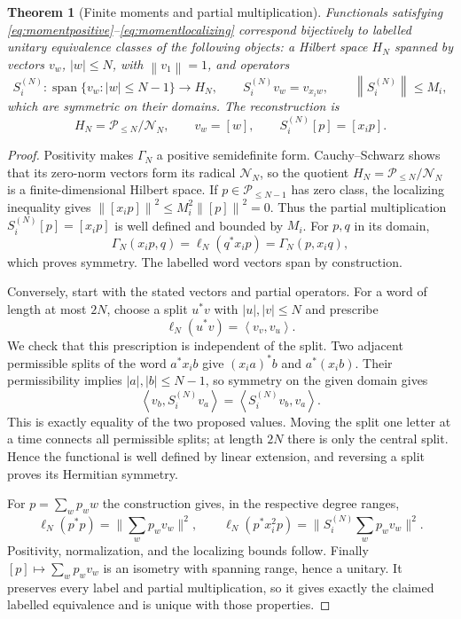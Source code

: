 \documentclass[11pt,a4paper]{amsart}
\numberwithin{equation}{section}
\newtheorem{theorem}{Theorem}[section]
\theoremstyle{definition}
\theoremstyle{remark}
\newcommand{\PP}{\mathcal P}
\DeclareMathOperator{\Span}{span}
\newcommand{\norm}[1]{\left\lVert#1\right\rVert}
\newcommand{\ip}[2]{\left\langle#1,#2\right\rangle}
\begin{document}
\begin{theorem}[Finite moments and partial multiplication]\label{thm:finitejet}
Functionals satisfying \eqref{eq:momentpositive}--\eqref{eq:momentlocalizing} correspond bijectively to labelled unitary equivalence classes of the following objects: a Hilbert space $H_N$ spanned by vectors $v_w$, $|w|\le N$, with $\norm{v_1}=1$, and operators
\[
 S_i^{(N)}:\Span\{v_w:|w|\le N-1\}\longrightarrow H_N,
 \qquad S_i^{(N)}v_w=v_{x_iw},\qquad \norm{S_i^{(N)}}\le M_i,
\]
which are symmetric on their domains. The reconstruction is
\begin{equation}\label{eq:jetinverse}
 H_N=\PP_{\le N}/\mathcal N_N,\qquad v_w=[w],\qquad
 S_i^{(N)}[p]=[x_ip].
\end{equation}
\end{theorem}
\begin{proof}
Positivity makes $\Gamma_N$ a positive semidefinite form. Cauchy--Schwarz shows that its zero-norm vectors form its radical $\mathcal N_N$, so the quotient $H_N=\PP_{\le N}/\mathcal N_N$ is a finite-dimensional Hilbert space. If $p\in\PP_{\le N-1}$ has zero class, the localizing inequality gives
$\norm{[x_ip]}^2\le M_i^2\norm{[p]}^2=0$.
Thus the partial multiplication $S_i^{(N)}[p]=[x_ip]$ is well defined and bounded by $M_i$. For $p,q$ in its domain,
\[
 \Gamma_N(x_ip,q)=\ell_N(q^*x_ip)=\Gamma_N(p,x_iq),
\]
which proves symmetry. The labelled word vectors span by construction.

Conversely, start with the stated vectors and partial operators. For a word of length at most $2N$, choose a split $u^*v$ with $|u|,|v|\le N$ and prescribe
\[
 \ell_N(u^*v)=\ip{v_v}{v_u}.
\]
We check that this prescription is independent of the split. Two adjacent permissible splits of the word $a^*x_ib$ give $(x_ia)^*b$ and $a^*(x_ib)$. Their permissibility implies $|a|,|b|\le N-1$, so symmetry on the given domain gives
\[
 \ip{v_b}{S_i^{(N)}v_a}=\ip{S_i^{(N)}v_b}{v_a}.
\]
This is exactly equality of the two proposed values. Moving the split one letter at a time connects all permissible splits; at length $2N$ there is only the central split. Hence the functional is well defined by linear extension, and reversing a split proves its Hermitian symmetry.

For $p=\sum_wp_ww$ the construction gives, in the respective degree ranges,
\[
 \ell_N(p^*p)=\Big\|\sum_wp_wv_w\Big\|^2,
 \qquad
 \ell_N(p^*x_i^2p)
 =\Big\|S_i^{(N)}\sum_wp_wv_w\Big\|^2.
\]
Positivity, normalization, and the localizing bounds follow. Finally $[p]\mapsto\sum_wp_wv_w$ is an isometry with spanning range, hence a unitary. It preserves every label and partial multiplication, so it gives exactly the claimed labelled equivalence and is unique with those properties.
\end{proof}
\end{document}
